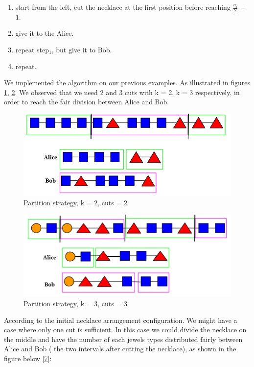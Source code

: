 \documentclass[a4paper,10pt]{article}
\begin{document}
\begin{enumerate}

    \item start from the left, cut the necklace at the first position before reaching $\frac{n_i}{2}$ + 1.
    \item give it to the Alice.
    \item repeat step$_1$, but give it to Bob.
    \item repeat.
    
    
    
    
\end{enumerate}

We implemented the algorithm on our previous examples. As illustrated in figures \ref{5}, \ref{6}. We observed that we need 2 and 3 cuts with k = 2, k = 3 respectively, in order to reach the fair division between Alice and Bob.

\begin{figure}[H]
  \centering
\includegraphics[scale=.4]{partition_strategy_k=2 (1).png}
\caption{Partition strategy, k = 2, cuts = 2}
\label{5}
\end{figure}

\begin{figure}[H]
  \centering
\includegraphics[scale=.35]{k = 3, cuts = 3.png}
\caption{Partition strategy, k = 3, cuts = 3}
\label{6}
\end{figure}

According to the initial necklace arrangement configuration. We might have a case where only one cut is sufficient. In this case we could divide the necklace on the middle and have the number of each jewels types distributed fairly between Alice and Bob ( the two intervals after cutting the necklace), as shown in the figure below \ref{7}:
\end{document}
